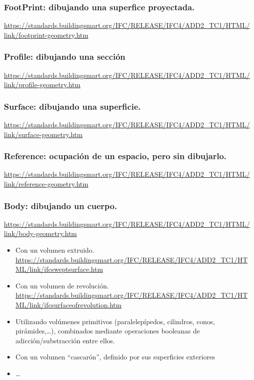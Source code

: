 \documentclass[spanish,12pt,a4paper,final,oneside]{book}
\begin{document}
\subsubsection{FootPrint: dibujando una superfice proyectada.}
\url{https://standards.buildingsmart.org/IFC/RELEASE/IFC4/ADD2_TC1/HTML/link/footprint-geometry.htm}

\subsubsection{Profile: dibujando una sección}
\url{https://standards.buildingsmart.org/IFC/RELEASE/IFC4/ADD2_TC1/HTML/link/profile-geometry.htm}

\subsubsection{\textbf{Surface}: dibujando una superficie.}
\url{https://standards.buildingsmart.org/IFC/RELEASE/IFC4/ADD2_TC1/HTML/link/surface-geometry.htm}

\subsubsection{Reference: ocupación de un espacio, pero sin dibujarlo.}
\url{https://standards.buildingsmart.org/IFC/RELEASE/IFC4/ADD2_TC1/HTML/link/reference-geometry.htm}

\subsubsection{\textbf{Body}: dibujando un cuerpo.}
\url{https://standards.buildingsmart.org/IFC/RELEASE/IFC4/ADD2_TC1/HTML/link/body-geometry.htm}

\begin{itemize}
\item Con un volumen extruido.
\\ \url{https://standards.buildingsmart.org/IFC/RELEASE/IFC4/ADD2_TC1/HTML/link/ifcsweptsurface.htm}

\item Con un volumen de revolución.
\\ \url{https://standards.buildingsmart.org/IFC/RELEASE/IFC4/ADD2_TC1/HTML/link/ifcsurfaceofrevolution.htm}

\item Utilizando volúmenes primitivos (paralelepípedos, cilindros, conos, pirámides,\ldots), combinados mediante operaciones booleanas de adicción/substracción entre ellos.

\item Con un volumen ``cascarón'', definido por sus superficies exteriores

\item \ldots
\end{itemize}
\end{document}
